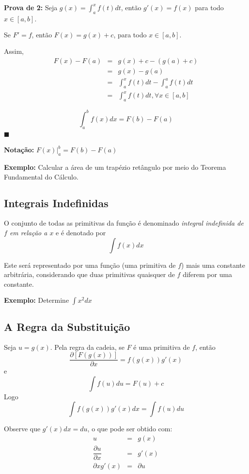 \documentclass[oneside,a4paper,12pt]{article}
\begin{document}
{\bf Prova de 2:} Seja $g(x) = \int_{a}^{x}f(t)dt$, então $g'(x) = f(x)$ para todo $x \in [a,b]$.

Se $F' = f$, então $F(x) = g(x) + c$, para todo $x \in [a,b]$.

Assim,
\begin{eqnarray*}
F(x) - F(a) &=& g(x) + c - (g(a) + c) \\
&=& g(x) - g(a) \\
&=& \int_{a}^{x}f(t)dt - \int_{a}^{a}f(t)dt \\
&=& \int_{a}^{x}f(t)dt, \forall x \in [a,b]
\end{eqnarray*}

$$\int_{a}^{b}f(x)dx = F(b) - F(a)$$ $\blacksquare$

{\bf Notação:} $F(x) |_{a}^{b} = F(b) - F(a)$

{\bf Exemplo:} Calcular a área de um trapézio retângulo por meio do Teorema Fundamental do Cálculo.

\vspace{100pt}

\subsection{Integrais Indefinidas}

O conjunto de todas as primitivas da função é denominado \emph{integral indefinida de $f$ em relação a $x$} e é denotado por 
$$\int f(x)dx$$

Este será representado por uma função (uma primitiva de $f$) mais uma constante arbitrária, considerando que duas primitivas quaisquer de $f$ diferem por uma constante.

{\bf Exemplo: } Determine $\int x^2 dx$

\vspace{300pt}

\subsection{A Regra da Substituição}

Seja $u=g(x)$. Pela regra da cadeia, se $F$ é uma primitiva de $f$, então
$$\dfrac{\partial[F(g(x))]}{\partial x} = f(g(x))g'(x)$$
e
$$\int f(u)du = F(u) + c$$
Logo
$$\int f(g(x))g'(x)dx = \int f(u)du$$

Observe que $g'(x)dx = du$, o que pode ser obtido com:
\begin{eqnarray*}
u & = & g(x) \\
\dfrac{\partial u}{\partial x} & = & g'(x) \\
\partial x g'(x) & = & \partial u
\end{eqnarray*}
\end{document}
